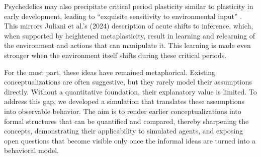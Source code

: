 \documentclass[12pt,fleqn]{article}
\begin{document}
Psychedelics may also precipitate critical period plasticity similar to plasticity in early development, leading to ``exquisite sensitivity to environmental input'' \cite[Abstract]{lepow_critical_2021}. This mirrors Juliani et al.'s (2024) description of acute shifts to inference, which, when supported by heightened metaplasticity, result in learning and relearning of the environment and actions that can manipulate it. This learning is made even stronger when the environment itself shifts during these critical periods.

For the most part, these ideas have remained metaphorical. Existing conceptualizations are often suggestive, but they rarely model their assumptions directly. Without a quantitative foundation, their explanatory value is limited. To address this gap, we developed a simulation that translates these assumptions into observable behavior. The aim is to render earlier conceptualizations into formal structures that can be quantified and compared, thereby sharpening the concepts, demonstrating their applicability to simulated agents, and exposing open questions that become visible only once the informal ideas are turned into a behavioral model.
\end{document}
